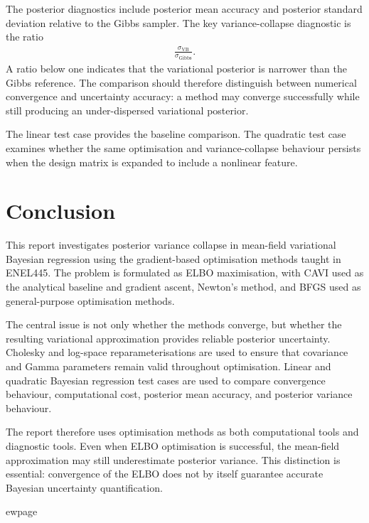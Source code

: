 \documentclass[11pt,a4paper]{article}
\begin{document}
The posterior diagnostics include posterior mean accuracy and posterior standard deviation relative to the Gibbs sampler. The key variance-collapse diagnostic is the ratio
\begin{align}
\frac{\sigma_{\mathrm{VB}}}{\sigma_{\mathrm{Gibbs}}}.
\end{align}
A ratio below one indicates that the variational posterior is narrower than the Gibbs reference. The comparison should therefore distinguish between numerical convergence and uncertainty accuracy: a method may converge successfully while still producing an under-dispersed variational posterior.

The linear test case provides the baseline comparison. The quadratic test case examines whether the same optimisation and variance-collapse behaviour persists when the design matrix is expanded to include a nonlinear feature.

\section{Conclusion}

This report investigates posterior variance collapse in mean-field variational Bayesian regression using the gradient-based optimisation methods taught in ENEL445. The problem is formulated as ELBO maximisation, with CAVI used as the analytical baseline and gradient ascent, Newton's method, and BFGS used as general-purpose optimisation methods.

The central issue is not only whether the methods converge, but whether the resulting variational approximation provides reliable posterior uncertainty. Cholesky and log-space reparameterisations are used to ensure that covariance and Gamma parameters remain valid throughout optimisation. Linear and quadratic Bayesian regression test cases are used to compare convergence behaviour, computational cost, posterior mean accuracy, and posterior variance behaviour.

The report therefore uses optimisation methods as both computational tools and diagnostic tools. Even when ELBO optimisation is successful, the mean-field approximation may still underestimate posterior variance. This distinction is essential: convergence of the ELBO does not by itself guarantee accurate Bayesian uncertainty quantification.

ewpage
\nocite{*}
\printbibliography
\newpage
\nocite{*}
\printbibliography
\setcounter{secnumdepth}{1}
\appendix
\renewcommand{\thesection}{Appendix~\Alph{section}}
\end{document}
